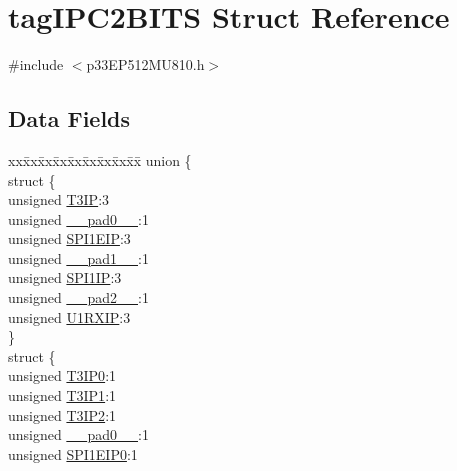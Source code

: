 \hypertarget{structtag_i_p_c2_b_i_t_s}{}\section{tag\+I\+P\+C2\+B\+I\+TS Struct Reference}
\label{structtag_i_p_c2_b_i_t_s}


{\ttfamily \#include $<$p33\+E\+P512\+M\+U810.\+h$>$}

\subsection*{Data Fields}
\begin{DoxyCompactItemize}
\item 
\begin{tabbing}
xx\=xx\=xx\=xx\=xx\=xx\=xx\=xx\=xx\=\kill
union \{\\
\>struct \{\\
\>\>unsigned \hyperlink{structtag_i_p_c2_b_i_t_s_ad2ca1e44aaf4a0a86a4ad0dff811e284}{T3IP}:3\\
\>\>unsigned \hyperlink{structtag_i_p_c2_b_i_t_s_adf71f3d8410c1f1dbbc96680a92c49af}{\_\_pad0\_\_}:1\\
\>\>unsigned \hyperlink{structtag_i_p_c2_b_i_t_s_a39be982336a707386e6fb8b4dcce8dfb}{SPI1EIP}:3\\
\>\>unsigned \hyperlink{structtag_i_p_c2_b_i_t_s_acaf2d0924a107ec6e8d2e31febaf66f9}{\_\_pad1\_\_}:1\\
\>\>unsigned \hyperlink{structtag_i_p_c2_b_i_t_s_a86d90340d645a626fb761ff6fd0a2ac8}{SPI1IP}:3\\
\>\>unsigned \hyperlink{structtag_i_p_c2_b_i_t_s_a4d97cc5f7d51d22fc2bf3eab35c9cb7f}{\_\_pad2\_\_}:1\\
\>\>unsigned \hyperlink{structtag_i_p_c2_b_i_t_s_a89223d5eb66484b07d609788f546b04d}{U1RXIP}:3\\
\>\} \\
\>struct \{\\
\>\>unsigned \hyperlink{structtag_i_p_c2_b_i_t_s_aa62c2390cd7f85508dac35e9d740b4dd}{T3IP0}:1\\
\>\>unsigned \hyperlink{structtag_i_p_c2_b_i_t_s_ab13152576099540fe61029275a38644a}{T3IP1}:1\\
\>\>unsigned \hyperlink{structtag_i_p_c2_b_i_t_s_add6f89cef9d87e1aa6b76a3c8af75176}{T3IP2}:1\\
\>\>unsigned \hyperlink{structtag_i_p_c2_b_i_t_s_adf71f3d8410c1f1dbbc96680a92c49af}{\_\_pad0\_\_}:1\\
\>\>unsigned \hyperlink{structtag_i_p_c2_b_i_t_s_a541f1c1a8c4955844511b94a1ceb9085}{SPI1EIP0}:1\\

\end{tabbing}
\end{DoxyCompactItemize}
